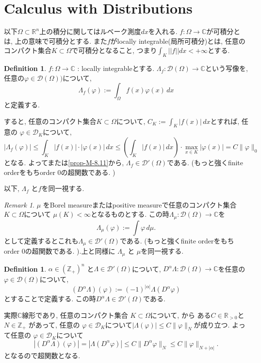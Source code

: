 \documentclass[dvipdfmx,a4paper,11pt]{article} %
\theoremstyle{definition}
\newtheorem{defn}[thm]{Definition}
\theoremstyle{remark}
\newtheorem{rem}[thm]{Remark}
\numberwithin{equation}{section}
\newcommand{\R}{\mathbb{R}}
\newcommand{\N}{\mathbb{Z}_+}
\newcommand{\C}{\mathbb{C}}
\begin{document}
\section{Calculus with Distributions}
以下$\Omega \subset \R^n$上の積分に関してはルベーク測度$dx$を入れる. 
$f : \Omega \to \C$が可積分とは, 上の意味で可積分とする. 
また$f$がlocally integrable(局所可積分)とは, 任意のコンパクト集合$K \subset \Omega$で可積分となること, つまり$\int_{K}||f|| dx < + \infty$とする. 
\begin{tcolorbox}[mybox]
\begin{defn}{\cite[6.11]{Rud}}
\label{defn-H-1}
\(f : \Omega \to \mathbb{C}\) : locally integrableとする. 
\(\Lambda_f : \mathcal{D}(\Omega) \to \mathbb{C}\)という写像を, 
任意の$\varphi \in \mathcal{D}(\Omega))$について, 
\[
\Lambda_f(\varphi) := \int_\Omega f(x) \varphi(x) \, dx
\]
と定義する. 

すると, 任意のコンパクト集合\(K \subset \Omega\)について, 
\(C_K := \int_K |f(x)| \, dx\)とすれば, 任意の 
\(\varphi \in \mathcal{D}_K\)について, 
\[
|\Lambda_f(\varphi)| \le \int_K |f(x)| \cdot |\varphi(x)| \, dx \le \left( \int_K |f(x)| \, dx \right) \cdot \max_{x \in K} |\varphi(x)| = C \|\varphi\|_{0}
\]
となる. よって\cite[Theorem 6.8]{Rud}または\ref{prop-M-8.11}から,  \(\Lambda_f \in \mathcal{D}'(\Omega)\)である. (もっと強くfinite orderをもちorder 0の超関数である. )
\end{defn}
\end{tcolorbox}

以下, \(\Lambda_f\) と\(f\)を同一視する. 

\begin{rem}
 \(\mu\) をBorel measureまたはpositive measureで任意のコンパクト集合$K \subset \Omega$について
\(\mu(K) < \infty\)となるものとする. 
この時\(\Lambda_\mu : \mathcal{D}(\Omega) \to \mathbb{C}\)を
\[
\Lambda_\mu(\varphi) := \int \varphi \, d\mu.
\]
として定義するとこれも\(\Lambda_\mu \in \mathcal{D}'(\Omega)\)である. (もっと強くfinite orderをもちorder 0の超関数である. ).上と同様に \(\Lambda_\mu\) と \(\mu\)を同一視する.
\end{rem}



\begin{tcolorbox}[mybox]
\begin{defn}{\cite[6.12]{Rud}}
\label{defn-H-3}
\(\alpha \in (\N)^n\) と\(\Lambda \in \mathcal{D}'(\Omega)\)について,  
\(D^\alpha \Lambda : \mathcal{D}(\Omega) \to \mathbb{C}\)を任意の$\varphi \in \mathcal{D}(\Omega)$について, 
\[
(D^\alpha \Lambda)(\varphi) := (-1)^{|\alpha|} \Lambda(D^\alpha \varphi) 
\]
とすることで定義する. この時\(D^\alpha \Lambda \in \mathcal{D}'(\Omega)\)である.
 
実際$\C$線形であり, 任意のコンパクト集合 \(K \subset \Omega\)について, \cite[Theorem 6.8]{Rud}から
ある\(C \in \mathbb{R}_{>0}\)と\(N \in \N\) があって, 任意の \(\varphi \in \mathcal{D}_K\)について\(|\Lambda(\varphi)| \le C \|\varphi\|_N\)が成り立つ. よって任意の \(\varphi \in \mathcal{D}_K\)について
\[
|(D^\alpha \Lambda)(\varphi)| = |\Lambda(D^\alpha \varphi)| \le C \|D^\alpha \varphi\|_N \le C \|\varphi\|_{N + |\alpha|}.
\]
となるので超関数となる. 
\end{defn}
\end{tcolorbox}
\end{document}
